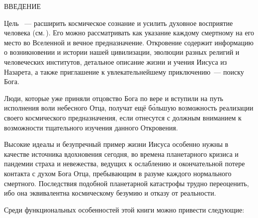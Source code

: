 \newpage
\thispagestyle{empty}
\fancyhead[C]{}

\makeatletter
{}%
\makeatother

\begin{center}
\bibpapertitlefont
ВВЕДЕНИЕ
\end{center}

\bibbookend

Цель ~--- расширить космическое сознание
и усилить духовное восприятие человека (см.\,).
Его можно рассматривать как указание каждому смертному на его место во Вселенной и вечное предназначение.
Откровение содержит информацию о возникновении и истории нашей цивилизации, эволюции разных религий
и человеческих институтов, детальное описание жизни и учения Иисуса из Назарета,
а также приглашение к увлекательнейшему приключению~--- поиску Бога.

Люди, которые уже приняли отцовство Бога по вере и вступили на путь исполнения воли небесного Отца, получат
ещё б\'ольшую возможность реализации своего космического предназначения, если отнесутся с должным вниманием
к возможности тщательного изучения данного Откровения.

Высокие идеалы и безупречный пример жизни Иисуса особенно нужны в качестве источника вдохновения сегодня,
во времена планетарного кризиса и пандемии страха и невежества,
ведущих к ослаблению и окончательной потере контакта с духом Бога Отца, пребывающим в разуме каждого нормального смертного.
Последствия подобной планетарной катастрофы трудно переоценить, ибо она эквивалентна космическому безумию и отказу от
реальности.

Среди функциональных особенностей этой книги можно привести следующие:

